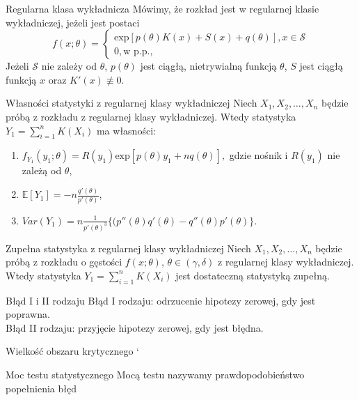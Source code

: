 \documentclass[avery5371, grid, frame]{flashcards}
\begin{document}
\begin{flashcard}[Definicja]{Regularna klasa wykładnicza}
    Mówimy, że rozkład jest w regularnej klasie wykładniczej, jeżeli jest postaci
    $$ f(x; \theta) =
    \begin{cases}
        \text{exp}[p(\theta) K(x) + S(x) + q(\theta)], x \in \mathcal{S} \\
        0, \text{w p.p.,} 
    \end{cases} $$
    Jeżeli $\mathcal{S}$ nie zależy od $\theta$, $p(\theta)$ jest ciągłą, nietrywialną funkcją $\theta$, $S$ jest ciągłą funkcją $x$ oraz $K'(x) \not\equiv 0$.
\end{flashcard}
    
\begin{flashcard}[Twierdzenie]{Własności statystyki z regularnej klasy wykładniczej}
    Niech $X_1, X_2, \dots, X_n$ będzie próbą z rozkładu z regularnej klasy wykładniczej. Wtedy statystyka $Y_1 = \sum_{i=1}^n K(X_i)$ ma własności:
    \begin{enumerate}
        \item $f_{Y_1}(y_1; \theta) = R(y_1) \text{exp}[p(\theta) y_1 + n q(\theta)],$ gdzie nośnik i $R(y_1)$ nie zależą od $\theta$,
        \item $\mathbb{E}[Y_1] = -n \frac{q'(\theta)}{p'(\theta)}$,
        \item $Var(Y_1) = n \frac{1}{p'(\theta)^3} \{ (p''(\theta)q'(\theta) - q''(\theta)p'(\theta) \} $.
    \end{enumerate}
\end{flashcard}

\begin{flashcard}[Twierdzenie]{Zupełna statystyka z regularnej klasy wykładniczej}
    Niech $X_1, X_2, \dots, X_n$ będzie próbą z rozkładu o gęstości $f(x; \theta)$, $\theta \in (\gamma, \delta)$ z regularnej klasy wykładniczej. Wtedy statystyka $Y_1 = \sum_{i=1}^n K(X_i)$ jest dostateczną statystyką zupełną.
\end{flashcard}

\begin{flashcard}[Definicja]{Błąd I i II rodzaju}
    Błąd I rodzaju: odrzucenie hipotezy zerowej, gdy jest poprawna. \\
    Błąd II rodzaju: przyjęcie hipotezy zerowej, gdy jest błędna.
\end{flashcard}

\begin{flashcard}[Definicja]{Wielkość obszaru krytycznego}
`
\end{flashcard}

\begin{flashcard}[Definicja]{Moc testu statystycznego}
    Mocą testu nazywamy prawdopodobieństwo popełnienia błęd
\end{flashcard}
\end{document}
